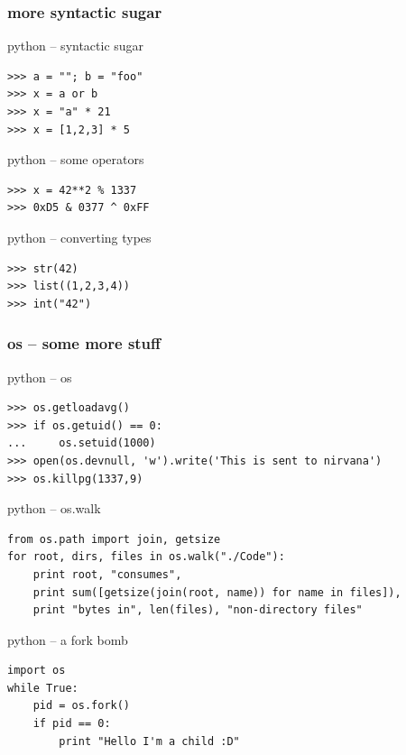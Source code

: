 \documentclass{beamer}
\begin{document}
\begin{frame}[fragile]
	\frametitle{more syntactic sugar}

	\begin{exampleblock}{python -- syntactic sugar}
	\begin{lstlisting}
>>> a = ""; b = "foo"
>>> x = a or b
>>> x = "a" * 21
>>> x = [1,2,3] * 5
	\end{lstlisting}
	\end{exampleblock}
\pause
	\begin{exampleblock}{python -- some operators}
	\begin{lstlisting}
>>> x = 42**2 % 1337
>>> 0xD5 & 0377 ^ 0xFF
	\end{lstlisting}
	\end{exampleblock}	
\pause
	\begin{exampleblock}{python -- converting types}
	\begin{lstlisting}
>>> str(42)
>>> list((1,2,3,4))
>>> int("42")	
	\end{lstlisting}
	\end{exampleblock}
\end{frame}

\begin{frame}
	\frametitle{os -- some more stuff}
	\begin{exampleblock}{python -- os}
	\begin{lstlisting}
>>> os.getloadavg()
>>> if os.getuid() == 0:
...     os.setuid(1000)
>>> open(os.devnull, 'w').write('This is sent to nirvana')
>>> os.killpg(1337,9)
	\end{lstlisting}
	\end{exampleblock}

	\begin{exampleblock}{python -- os.walk}
	\begin{lstlisting}
from os.path import join, getsize
for root, dirs, files in os.walk("./Code"):
    print root, "consumes",
    print sum([getsize(join(root, name)) for name in files]),
    print "bytes in", len(files), "non-directory files"
	\end{lstlisting}
	\end{exampleblock}

\newpage
	\begin{exampleblock}{python -- a fork bomb}
	\begin{lstlisting}
import os
while True:
    pid = os.fork()
    if pid == 0:
        print "Hello I'm a child :D"
	\end{lstlisting}
	\end{exampleblock}
\end{frame}
\end{document}
